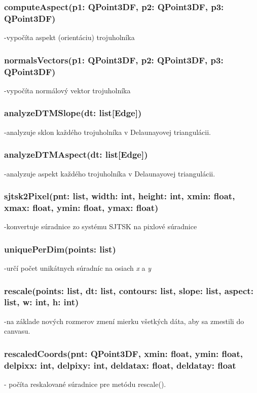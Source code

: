 \documentclass[12pt]{article}
\begin{document}
\subsubsection*{computeAspect(p1: QPoint3DF, p2: QPoint3DF, p3: QPoint3DF)}
\noindent-vypočíta aspekt (orientáciu) trojuholníka
\subsubsection*{normalsVectors(p1: QPoint3DF, p2: QPoint3DF, p3: QPoint3DF)}
\noindent-vypočíta normálový vektor trojuholníka
\subsubsection*{analyzeDTMSlope(dt: list[Edge])}
\noindent-analyzuje sklon každého trojuholníka v Delaunayovej triangulácii.
\subsubsection*{analyzeDTMAspect(dt: list[Edge])}
\noindent-analyzuje aspekt každého trojuholníka v Delaunayovej triangulácii.
\subsubsection*{sjtsk2Pixel(pnt: list, width: int, height: int, x\textunderscore min: float, x\textunderscore max: float, y\textunderscore min: float, y\textunderscore max: float)}
\noindent-konvertuje súradnice zo systému SJTSK na pixlové súradnice
\subsubsection*{uniquePerDim(points: list)}
\noindent-určí počet unikátnych súradníc na osiach \textit{x} a \textit{y}
\subsubsection*{rescale(points: list, dt: list, contours: list, slope: list, aspect: list, w: int, h: int)}
\noindent-na základe nových rozmerov zmení mierku všetkých dáta, aby sa zmestili do canvasu.

\subsubsection*{rescaledCoords(pnt: QPoint3DF, x\textunderscore min: float, y\textunderscore min: float, del\textunderscore pix\textunderscore x: int, del\textunderscore pix\textunderscore y: int, del\textunderscore data\textunderscore x: float, del\textunderscore data\textunderscore y: float}
\noindent- počíta reskalované súradnice pre metódu rescale().
\end{document}
